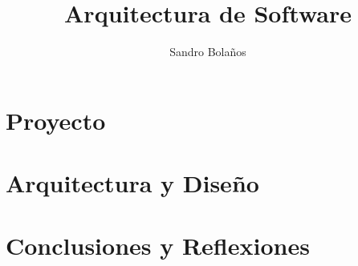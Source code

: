 \documentclass[11pt]{book}
\title{Arquitectura de Software}
\author{Sandro Bolaños}
\begin{document}
\maketitle
\tableofcontents	
	
\part{Proyecto}	



\part{Arquitectura y Diseño}










\part{Conclusiones y Reflexiones}
	
	



	
	
\end{document}
